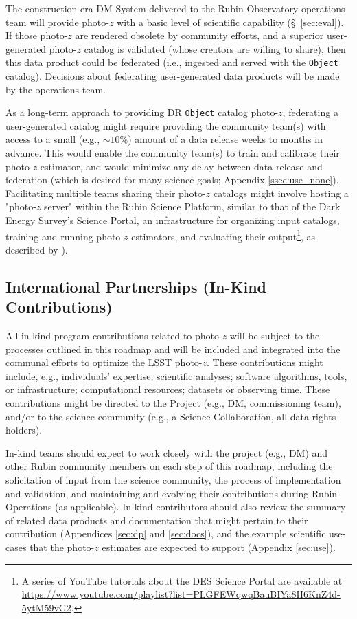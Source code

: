 \documentclass[DM,lsstdraft,toc]{lsstdoc}
\begin{document}
The construction-era DM System delivered to the Rubin Observatory operations team will provide photo-$z$ with a basic level of scientific capability (\S~\ref{sec:eval}). 
If those photo-$z$ are rendered obsolete by community efforts, and a superior user-generated photo-$z$ catalog is validated (whose creators are willing to share), then this data product could be federated (i.e., ingested and served with the {\tt Object} catalog).
Decisions about federating user-generated data products will be made by the operations team.

As a long-term approach to providing DR {\tt Object} catalog photo-$z$, federating a user-generated catalog might require providing the community team(s) with access to a small (e.g., $\sim10\%$) amount of a data release weeks to months in advance.
This would enable the community team(s) to train and calibrate their photo-$z$ estimator, and would minimize any delay between data release and federation (which is desired for many science goals; Appendix \ref{ssec:use_none}).
Facilitating multiple teams sharing their photo-$z$ catalogs might involve hosting a "photo-$z$ server" within the Rubin Science Platform, similar to that of the Dark Energy Survey's Science Portal, an infrastructure for organizing input catalogs, training and running photo-$z$ estimators, and evaluating their output\footnote{A series of YouTube tutorials about the DES Science Portal are available at \url{https://www.youtube.com/playlist?list=PLGFEWqwqBauBIYa8H6KnZ4d-5ytM59vG2}.}, as described by \citet{2018A&C....25...58G}).

\subsection{International Partnerships (In-Kind Contributions)}\label{ssec:time_inkind}

All in-kind program contributions related to photo-$z$ will be subject to the processes outlined in this  roadmap and will be included and integrated into the communal efforts to optimize the LSST photo-$z$.
These contributions might include, e.g., individuals' expertise; scientific analyses; software algorithms, tools, or infrastructure; computational resources; datasets or observing time.
These contributions might be directed to the Project (e.g., DM, commissioning team), and/or to the science community (e.g., a Science Collaboration, all data rights holders). 

In-kind teams should expect to work closely with the project (e.g., DM) and other Rubin community members on each step of this  roadmap, including the solicitation of input from the science community, the process of implementation and validation, and maintaining and evolving their contributions during Rubin Operations (as applicable).
In-kind contributors should also review the summary of related data products and documentation that might pertain to their contribution (Appendices \ref{sec:dp} and  \ref{sec:docs}), and the example scientific use-cases that the photo-$z$ estimates are expected to support (Appendix \ref{sec:use}).
\end{document}
